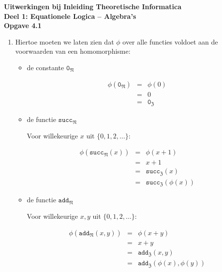 \documentclass[a4paper,11pt]{article}
\begin{document}
{\bf Uitwerkingen bij Inleiding Theoretische Informatica\\
Deel 1: Equationele Logica -- Algebra's}\\[2em]


{\bf Opgave 4.1}

\begin{enumerate}

\item %

Hiertoe moeten we laten zien dat $\phi$ over alle functies voldoet aan de
voorwaarden van een homomorphisme:

\begin{itemize}

\item{de constante $\texttt{0}_{\mathfrak{N}}$}

  \begin{eqnarray*}
    \phi(\texttt{0}_{\mathfrak{N}}) & = & \phi(0) \\
                                  & = & 0 \\
                                  & = & \texttt{0}_{\mathfrak{Z}}
  \end{eqnarray*}

\item{de functie $\texttt{succ}_{\mathfrak{N}}$}

  Voor willekeurige $x$ uit $\{0,1,2,\ldots\}$:

  \begin{eqnarray*}
    \phi(\texttt{succ}_{\mathfrak{N}}(x)) & = & \phi(x+1) \\
                                        & = & x+1 \\
                                        & = & \texttt{succ}_{\mathfrak{Z}}(x) \\
                                        & = & \texttt{succ}_{\mathfrak{Z}}(\phi(x))
  \end{eqnarray*}

\item{de functie $\texttt{add}_{\mathfrak{N}}$}

  Voor willekeurige $x,y$ uit $\{0,1,2,\ldots\}$:

  \begin{eqnarray*}
    \phi(\texttt{add}_{\mathfrak{N}}(x,y)) & = & \phi(x+y) \\
                                         & = & x+y \\
                                         & = & \texttt{add}_{\mathfrak{Z}}(x,y) \\
                                         & = &
                                         \texttt{add}_{\mathfrak{Z}}(\phi(x),\phi(y))
  \end{eqnarray*}


\end{itemize}
\end{enumerate}
\end{document}
